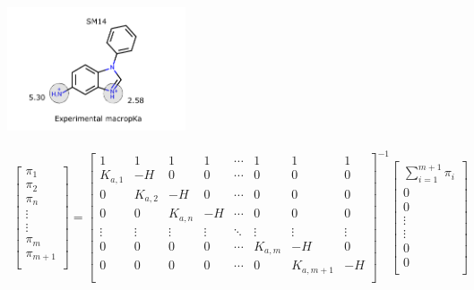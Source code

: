 \documentclass[9pt,lineno,final]{elife}
\begin{document}
\begin{figure}[H]
	\centering	
	\includegraphics[width=0.47\textwidth]{Images/Molecules/SM14-pka.pdf} \hfill
	
	\begin{gather*}
\begin{bmatrix} \pi_{1} \\ \pi_{2} \\ \pi_{n} \\ \vdots \\ \vdots \\ \pi_{m} \\ \pi_{m+1}\\ \end{bmatrix}
=
\begin{bmatrix}
 1       & 1       & 1       & 1       & \cdots    & 1& 1  & 1 \\
 K_{a,1} & -H      & 0       & 0       & \cdots    & 0&0  & 0 \\
 0       & K_{a,2} & -H      & 0       & \cdots    & 0&0  & 0 \\
 0       & 0       & K_{a,n} & -H      & \cdots    & 0&0  & 0 \\  
 \vdots  & \vdots  & \vdots  & \vdots  & \ddots    & \vdots & \vdots  & \vdots \\
 0       & 0       & 0       & 0       & \cdots    & K_{a,m} & -H & 0 \\  
 0       & 0       & 0       & 0       & \cdots    &         0    & K_{a,m+1}   & -H \\
\end{bmatrix}^{-1}
\begin{bmatrix} \sum_{i=1}^{m+1} \pi_i \\ 0 \\ 0 \\ \vdots \\ \vdots \\ 0 \\ 0\\ \end{bmatrix}\\
\end{gather*}

\end{figure}
\end{document}
